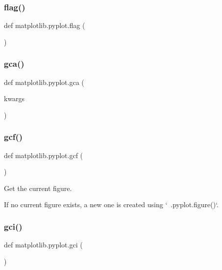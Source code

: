 \subsubsection{\texorpdfstring{flag()}{flag()}}
{\footnotesize\ttfamily def matplotlib.\+pyplot.\+flag (\begin{DoxyParamCaption}{ }\end{DoxyParamCaption})}

\mbox{\label{namespacematplotlib_1_1pyplot_a5caf006dd7ad1b34c5b806459a2ed19e}} 
\subsubsection{\texorpdfstring{gca()}{gca()}}
{\footnotesize\ttfamily def matplotlib.\+pyplot.\+gca (\begin{DoxyParamCaption}\item[{}]{kwargs }\end{DoxyParamCaption})}

\mbox{\label{namespacematplotlib_1_1pyplot_aef22f981e45053fcae200518ec4a7b25}} 
\subsubsection{\texorpdfstring{gcf()}{gcf()}}
{\footnotesize\ttfamily def matplotlib.\+pyplot.\+gcf (\begin{DoxyParamCaption}{ }\end{DoxyParamCaption})}

\begin{DoxyVerb}Get the current figure.

If no current figure exists, a new one is created using
`~.pyplot.figure()`.
\end{DoxyVerb}
 \mbox{\label{namespacematplotlib_1_1pyplot_a07302c3a1b7a35a9a5e46c48b92d9012}} 
\subsubsection{\texorpdfstring{gci()}{gci()}}
{\footnotesize\ttfamily def matplotlib.\+pyplot.\+gci (\begin{DoxyParamCaption}{ }\end{DoxyParamCaption})}

